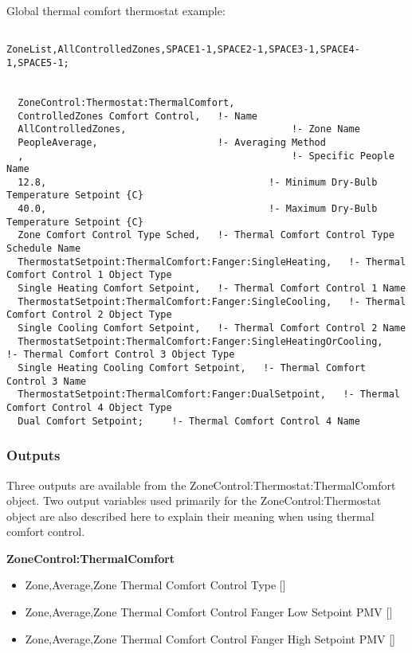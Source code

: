 Global thermal comfort thermostat example:

\begin{lstlisting}

ZoneList,AllControlledZones,SPACE1-1,SPACE2-1,SPACE3-1,SPACE4-1,SPACE5-1;


  ZoneControl:Thermostat:ThermalComfort,
  ControlledZones Comfort Control,   !- Name
  AllControlledZones,                             !- Zone Name
  PeopleAverage,                     !- Averaging Method
  ,                                               !- Specific People Name
  12.8,                                       !- Minimum Dry-Bulb Temperature Setpoint {C}
  40.0,                                       !- Maximum Dry-Bulb Temperature Setpoint {C}
  Zone Comfort Control Type Sched,   !- Thermal Comfort Control Type Schedule Name
  ThermostatSetpoint:ThermalComfort:Fanger:SingleHeating,   !- Thermal Comfort Control 1 Object Type
  Single Heating Comfort Setpoint,   !- Thermal Comfort Control 1 Name
  ThermostatSetpoint:ThermalComfort:Fanger:SingleCooling,   !- Thermal Comfort Control 2 Object Type
  Single Cooling Comfort Setpoint,   !- Thermal Comfort Control 2 Name
  ThermostatSetpoint:ThermalComfort:Fanger:SingleHeatingOrCooling,   !- Thermal Comfort Control 3 Object Type
  Single Heating Cooling Comfort Setpoint,   !- Thermal Comfort Control 3 Name
  ThermostatSetpoint:ThermalComfort:Fanger:DualSetpoint,   !- Thermal Comfort Control 4 Object Type
  Dual Comfort Setpoint;     !- Thermal Comfort Control 4 Name
\end{lstlisting}

\subsubsection{Outputs}\label{outputs-3-024}

Three outputs are available from the ZoneControl:Thermostat:ThermalComfort object. Two output variables used primarily for the ZoneControl:Thermostat object are also described here to explain their meaning when using thermal comfort control.

\textbf{ZoneControl:ThermalComfort}

\begin{itemize}
\item
  Zone,Average,Zone Thermal Comfort Control Type {[]}
\item
  Zone,Average,Zone Thermal Comfort Control Fanger Low Setpoint PMV {[]}
\item
  Zone,Average,Zone Thermal Comfort Control Fanger High Setpoint PMV {[]}
\end{itemize}

